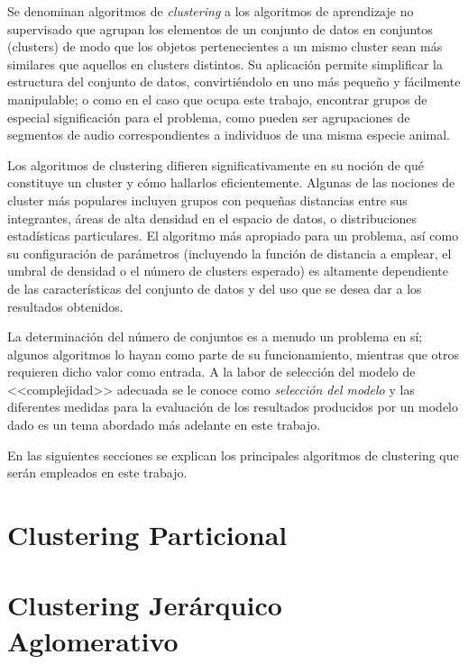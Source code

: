 Se denominan algoritmos de \textit{clustering} a los algoritmos de aprendizaje no supervisado que agrupan los elementos de un conjunto de datos en conjuntos (clusters) de modo que los objetos pertenecientes a un mismo cluster sean más similares que aquellos en clusters distintos.
Su aplicación permite simplificar la estructura del conjunto de datos, convirtiéndolo en uno más pequeño y fácilmente manipulable;
o como en el caso que ocupa este trabajo, encontrar grupos de especial significación para el problema, como pueden ser agrupaciones de segmentos de audio correspondientes a individuos de una misma especie animal.

Los algoritmos de clustering difieren significativamente en su noción de qué constituye un cluster y cómo hallarlos eficientemente.
Algunas de las nociones de cluster más populares incluyen grupos con pequeñas distancias entre sus integrantes, áreas de alta densidad en el espacio de datos, o distribuciones estadísticas particulares.
El algoritmo más apropiado para un problema, así como su configuración de parámetros (incluyendo la función de distancia a emplear, el umbral de densidad o el número de clusters esperado) es altamente dependiente de las características del conjunto de datos y del uso que se desea dar a los resultados obtenidos.

La determinación del número de conjuntos es a menudo un problema en sí;
algunos algoritmos lo hayan como parte de su funcionamiento, mientras que otros requieren dicho valor como entrada.
A la labor de selección del modelo de <<complejidad>> adecuada se le conoce como \textit{selección del modelo} y las diferentes medidas para la evaluación de los resultados producidos por un modelo dado es un tema abordado más adelante en este trabajo.

En las siguientes secciones se explican los principales algoritmos de clustering que serán empleados en este trabajo.

\section{Clustering Particional}\label{sec:clusteringParticional}


\section{Clustering Jerárquico Aglomerativo}\label{sec:clusteringJerárquicoAglomerativo}



